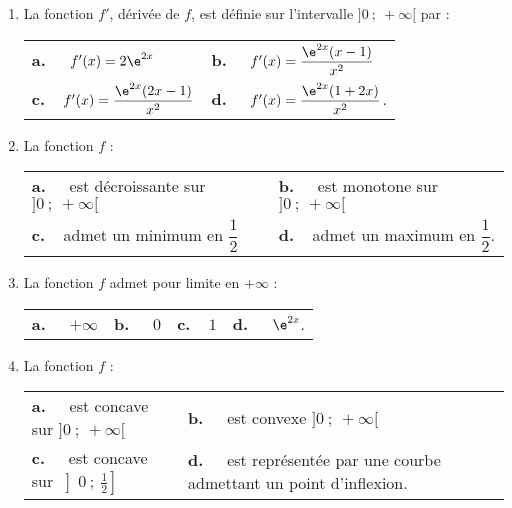 \begin{enumerate}
\item La fonction $f'$, dérivée de $f$, est définie sur l'intervalle $]0~;~+\infty[$ par :

\begin{tabularx}{\linewidth}{*{2}{X}}
\textbf{a.~~} $f'(x) = 2\e^{2x}$ 					&\textbf{b.~~} $f'(x)=\dfrac{\e^{2x}(x-1)}{x^2} $\\[0.35cm]
\textbf{c.~~}$ f'(x) = \dfrac{\e^{2x}(2x - 1)}{x^2}$& \textbf{d.~~} $f'(x)=\dfrac{\e^{2x}(1 + 2x)}{x^2} $.\\
\end{tabularx}

\item La fonction $f$ :

\begin{tabularx}{\linewidth}{*{2}{X}}
\textbf{a.~~} est décroissante sur $]0~;~+\infty[ $ &\textbf{b.~~} est monotone sur $]0~;~+\infty[$\\
\textbf{c.~~}admet un minimum en $\dfrac{1}{2}$		& \textbf{d.~~}admet un maximum en $\dfrac{1}{2}$.
\end{tabularx}
\item  La fonction $f$ admet pour limite en $+ \infty$ :

\begin{tabularx}{\linewidth}{*{4}{X}}
\textbf{a.~~} $+\infty $ &\textbf{b.~~} $0$&\textbf{c.~~}$1$& \textbf{d.~~} $\e^{2x}$.
\end{tabularx}
\item  La fonction $f$ :

\begin{tabularx}{\linewidth}{*{4}{X}}
\textbf{a.~~} est concave sur $]0~;~+\infty[$ &\textbf{b.~~} est convexe  $]0~;~+\infty[$\\
\textbf{c.~~} est concave sur $\left]0~;~\frac{1}{2}\right] $& \textbf{d.~~} est représentée par une courbe
admettant un point d'inflexion.\\
\end{tabularx}
 
\end{enumerate}

\vspace{0,5cm}

